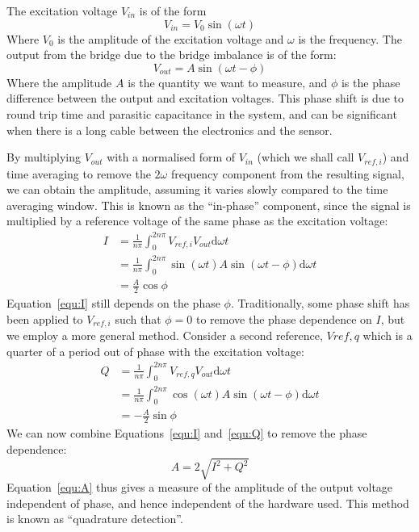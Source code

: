 \documentclass[12pt,a4paper]{article}
\begin{document}
The excitation voltage $V_{in}$ is of the form
\begin{equation}
  \label{equ:vin}
  V_{in} = V_0\sin(\omega t)
\end{equation}
Where $V_0$ is the amplitude of the excitation voltage and $\omega$ is the frequency. The output from the bridge due to the bridge imbalance is of the form:
\begin{equation}
  \label{equ:vout}
  V_{out} = A\sin(\omega t - \phi)
\end{equation}
Where the amplitude $A$ is the quantity we want to measure, and $\phi$ is the phase difference between the output and excitation voltages. This phase
shift is due to round trip time and parasitic capacitance in the system, and can be significant when there is a long cable between the electronics and
the sensor.

By multiplying $V_{out}$ with a normalised form of $V_{in}$ (which we shall call $V_{ref,i}$) and time averaging to remove the $2\omega$ frequency component
from the resulting signal, we can obtain the amplitude, assuming it varies slowly compared to the time averaging window. This is known as the ``in-phase''
component, since the signal is multiplied by a reference voltage of the same phase as the excitation voltage:
\begin{equation}
  \label{equ:I}
  \begin{split}
  I &= \frac{1}{n\pi}\int_{0}^{2n\pi}V_{ref,i}V_{out}\mathrm{d}\omega t \\
  &= \frac{1}{n\pi}\int_{0}^{2n\pi}\sin(\omega t) A \sin(\omega t - \phi)\mathrm{d}\omega t \\
  &= \frac{A}{2}\cos \phi
  \end{split}
\end{equation}
Equation~\ref{equ:I} still depends on the phase $\phi$. Traditionally, some phase shift has been applied to $V_{ref,i}$ such that $\phi = 0$ to remove the
phase dependence on $I$, but we employ a more general method. Consider a second reference, $V{ref,q}$ which is a quarter of a period out of phase with the
excitation voltage:
\begin{equation}
  \label{equ:Q}
  \begin{split}
  Q &= \frac{1}{n\pi}\int_{0}^{2n\pi}V_{ref,q}V_{out}\mathrm{d}\omega t \\
  &= \frac{1}{n\pi}\int_{0}^{2n\pi}\cos(\omega t) A \sin(\omega t - \phi)\mathrm{d}\omega t \\
  &= -\frac{A}{2}\sin \phi
  \end{split}
\end{equation}
We can now combine Equations~\ref{equ:I} and~\ref{equ:Q} to remove the phase dependence:
\begin{equation}
  \label{equ:A}
  A = 2\sqrt{I^2 + Q^2}
\end{equation}
Equation~\ref{equ:A} thus gives a measure of the amplitude of the output voltage independent of phase, and hence independent of the hardware used. This
method is known as ``quadrature detection''.
\end{document}
